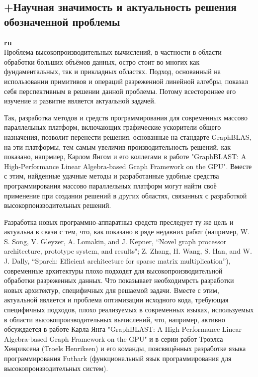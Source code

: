 \documentclass[12pt]{article}  %
\theoremstyle{remark}
\begin{document}
\subsection{+Научная значимость и актуальность решения обозначенной проблемы}

\textbf{ru}\\

Проблема высокопроизводительных вычислений, в частности в области обработки больших объёмов данных, остро стоит во многих как фундаментальных, так и прикладных областях. Подход, основанный на использовании примитивов и операций разреженной линейной алгебры, показал себя перспективным в решении данной проблемы. Потому всестороннее его изучение и развитие является актуальной задачей.

Так, разработка методов и средств программирования для современных массово параллельных платформ, включающих графические ускорители общего назначения, позволит перенести решения, основанные на стандарте GraphBLAS, на эти платформы, тем самым увеличив производительность решений, как показано, напрмиер, Карлом Янгом и его коллегами в работе "GraphBLAST: A High-Performance Linear Algebra-based Graph Framework on the GPU". Вместе с этим, найденные удачные методы и разработанные удобные средства программирования массово параллельных платформ могут найти своё применение при создании решений в других областях, связанных с разработкой высокорпоизводительных решений. 

Разработка новых программно-аппаратныз средств преследует ту же цель и актуальна в связи с тем, что, как показано в ряде недавних работ (например, W. S. Song, V. Gleyzer, A. Lomakin, and J. Kepner, “Novel graph
processor architecture, prototype system, and results"; Z. Zhang, H. Wang, S. Han, and W. J. Dally, “Sparch: Efficient architecture for sparse matrix multiplication”), современные архитектуры плохо подходят для высокопроизводительной обработки разреженных данных. Что показывает необходимрсть разработки новых архитектур, специфичных для решаемой задачи. Вместе с этим, актуальной является и проблема оптимизации исходного кода, требующая специфичных подходов, плохо реализуемых в современных языках, используемых в области высокопроизводительных вычислений, что, например, активно обсуждается в работе Карла Янга "GraphBLAST: A High-Performance Linear Algebra-based Graph Framework on the GPU" и в серии работ Троэлса Хенриксена (Troels Henriksen) и его команды, поясвящённых разработке языка программирования Futhark (функциональный язык программирования для высокопроизводительных систем). 
\end{document}
